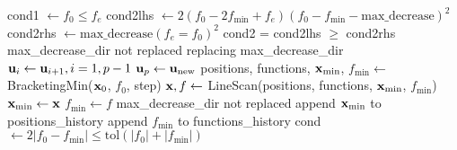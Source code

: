 \begin{algorithm}
\begin{algorithmic}[1]
            \State cond1 $\gets f_0 \leq f_e$
            \State cond2lhs $\gets 2(f_0 - 2f_{\text{min}} + f_e)(f_0 - f_{\text{min}} - \text{max\_decrease})^2$
            \State cond2rhs $\gets \text{max\_decrease}(f_e = f_0)^2$
            \State cond2 = cond2lhs $\geq$ cond2rhs
                \State \Output max\_decrease\_dir not replaced
                \State \Output replacing max\_decrease\_dir
                \State $\vb{u}_i\gets \vb{u}_{i+1}, i=1, p-1$
                \State $\vb{u}_p\gets \vb{u}_{\text{new}}$
                \State positions, functions, $\vb{x}_{\text{min}}$, $f_{\text{min}}\gets  $ BracketingMin($\vb{x}_0$, $f_0$, step)
                \State $\vb{x}, f \gets$ LineScan(positions, functions, $\vb{x}_{\text{min}}$, $f_{\text{min}}$)
                \State $\vb{x}_{\text{min}}\gets \vb{x}$
                \State $f_{\text{min}}\gets f$
            \Else
                \State \Output max\_decrease\_dir not replaced
            \EndIf
            \State append $\vb{x}_{\text{min}}$ to positions\_history
            \State append ${f}_{\text{min}}$ to functions\_history
            \State cond $\gets 2 |f_0 - f_{\text{min}}|\leq \text{tol}(|f_0|  + |f_{\text{min}}|)$
            \If{}
            \EndIf
        \EndFor





    \EndFunction
    \end{algorithmic}
    \end{algorithm}

